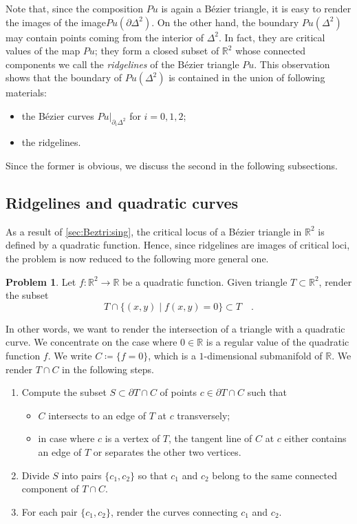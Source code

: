 \documentclass[pdftex,a4paper,12pt]{scrartcl}
\theoremstyle{plain}
\theoremstyle{definition}
\newtheorem{problem}{Problem}
\theoremstyle{remark}
\numberwithin{equation}{section}
\begin{document}
Note that, since the composition $Pu$ is again a B\'ezier triangle, it is easy to render the images of the image$Pu(\partial\Delta^2)$.
On the other hand, the boundary $Pu(\Delta^2)$ may contain points coming from the interior of $\Delta^2$.
In fact, they are critical values of the map $Pu$; they form a closed subset of $\mathbb R^2$ whose connected components we call the \emph{ridgelines} of the B\'ezier triangle $Pu$.
This observation shows that the boundary of $Pu(\Delta^2)$ is contained in the union of following materials:
\begin{itemize}
  \item the B\'ezier curves $\left.Pu\right|_{\partial_i\Delta^2}$ for $i=0,1,2$;
  \item the ridgelines.
\end{itemize}
Since the former is obvious, we discuss the second in the following subsections.

\subsection{Ridgelines and quadratic curves}

As a result of \cref{sec:Beztri:sing}, the critical locus of a B\'ezier triangle in $\mathbb R^2$ is defined by a quadratic function.
Hence, since ridgelines are images of critical loci, the problem is now reduced to the following more general one.

\begin{problem}
Let $f:\mathbb R^2\to\mathbb R$ be a quadratic function.
Given triangle $T\subset\mathbb R^2$, render the subset
\[
T\cap\{(x,y)\mid f(x,y)=0\}\subset T
\quad.
\]
\end{problem}

In other words, we want to render the intersection of a triangle with a quadratic curve.
We concentrate on the case where $0\in\mathbb R$ is a regular value of the quadratic function $f$.
We write $C\coloneqq \{f=0\}$, which is a $1$-dimensional submanifold of $\mathbb R$.
We render $T\cap C$ in the following steps.
\begin{enumerate}[label=\underline{\textit{Step~\arabic*}}:\:,leftmargin=\widthof{\itshape Step00:}]
  \item Compute the subset $S\subset \partial T\cap C$ of points $c\in\partial T\cap C$ such that
\begin{itemize}
  \item $C$ intersects to an edge of $T$ at $c$ transversely;
  \item in case where $c$ is a vertex of $T$, the tangent line of $C$ at $c$ either contains an edge of $T$ or separates the other two vertices.
\end{itemize}
  \item Divide $S$ into pairs $\{c_1,c_2\}$ so that $c_1$ and $c_2$ belong to the same connected component of $T\cap C$.
  \item For each pair $\{c_1,c_2\}$, render the curves connecting $c_1$ and $c_2$.
\end{enumerate}
\end{document}
